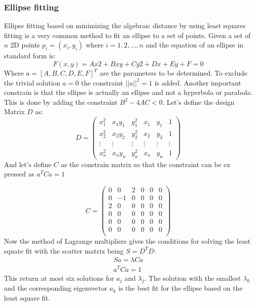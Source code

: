     \subsubsection{Ellipse fitting}
    \label{subsubsec:ellipsefitting}
    Ellipse fitting \cite{fitzgibbon_direct_2000} based on minimizing the algebraic distance by using least squares fitting is a very common method to fit an ellipse to a set of points. Given a set of $n$ 2D points $p_i = (x_i, y_i)$ where $i = 1,2,...,n$ and the equation of an ellipse in standard form is: 
    \begin{equation}
        F(x,y)=Ax2+Bxy+Cy2+Dx+Ey+F=0
        \label{eq:ellipse_standard}
    \end{equation}
    Where $a=[A, B, C, D, E, F]^T$ are the parameters to be determined. To exclude the trivial solution $a=0$ the constraint $||a||^2=1$ is added. Another important constrain is that the ellipse is actually an ellipse and not a hyperbola or parabola. This is done by adding the constraint $B^2-4AC<0$.
    Let's define the design Matrix $D$ as: 
    \begin{equation}
        D = \begin{pmatrix}
        x_1^2 & x_1y_1 & y_1^2 & x_1 & y_1 & 1 \\
        x_2^2 & x_2y_2 & y_2^2 & x_2 & y_2 & 1 \\
        \vdots & \vdots & \vdots & \vdots & \vdots & \vdots \\
        x_n^2 & x_ny_n & y_n^2 & x_n & y_n & 1 
        \end{pmatrix}
        \label{DesignMatrix}
        \end{equation}
    And let's define $C$ as the constrain matrix so that the constraint can be ex pressed as $a^TCa=1$

        \begin{equation}
            C = \begin{pmatrix}
            0 & 0 & 2 & 0 & 0 & 0 \\
            0 & -1 & 0 & 0 & 0 & 0 \\
            2 & 0 & 0 & 0 & 0 & 0 \\
            0 & 0 & 0 & 0 & 0 & 0 \\
            0 & 0 & 0 & 0 & 0 & 0 \\
            0 & 0 & 0 & 0 & 0 & 0 \\
            \end{pmatrix} \label{eq:C}
        \end{equation}
Now the method of Lagrange multipliers \cite{gander_least_1980} gives the conditions for solving the least squate fit with the scatter matrix being $S=D^TD$: 
\begin{gather}
    Sa = \lambda Ca \\
    a^TCa=1
\end{gather}
This return at most six solutions for $a_j$ and $\lambda_j$. The solution with the smallest $\lambda_k$ and the corresponding eigenvector $a_k$ is the best fit for the ellipse based on the least square fit. 

